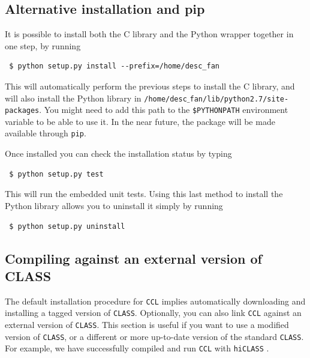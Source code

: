 \documentclass[\docopts]{\docclass}
\newcommand{\ccl}{{\tt CCL}\xspace}
\begin{document}
\subsection{Alternative installation and pip}
\label{sec:install:alternative}

It is possible to install both the C library and the Python wrapper together in one step, by running
\begin{verbatim}
 $ python setup.py install --prefix=/home/desc_fan
\end{verbatim}
This will automatically perform the previous steps to install the C library, and will also install the Python library in {\tt /home/desc$\_$fan/lib/python2.7/site-packages}. You might need to add this path to the {\tt \$PYTHONPATH} environment variable to be able to use it. In the near future, the package will be made available through {\tt pip}.

Once installed you can check the installation status by typing
\begin{verbatim}
 $ python setup.py test
\end{verbatim}

This will run the embedded unit tests. Using this last method to install the Python library allows you to uninstall it simply by running
\begin{verbatim}
 $ python setup.py uninstall
\end{verbatim}

\subsection{Compiling against an external version of CLASS}
\label{sec:extclass}

The default installation procedure for \ccl implies automatically downloading and installing a tagged version of {\tt CLASS}. Optionally, you can also link \ccl against an external version of {\tt CLASS}. This section is useful if you want to use a modified version of {\tt CLASS}, or a different or more up-to-date version of the standard {\tt CLASS}. For example, we have successfully compiled and run \ccl with {\tt hiCLASS} \citep{hiclass}.
\end{document}
